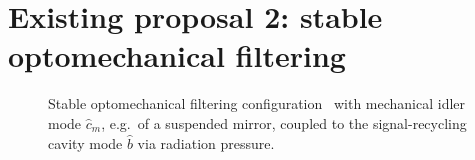 \section{Existing proposal 2: stable optomechanical filtering}
\label{sec:sWLC}

\begin{figure}
	\centering
	\caption{Stable optomechanical filtering configuration~\cite{Li2021} with mechanical idler mode $\hat{c}_m$, e.g.\ of a suspended mirror, coupled to the signal-recycling cavity mode $\hat b$ via radiation pressure.}
	\label{fig:sWLC_config}
\end{figure}



